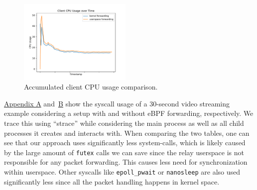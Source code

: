 \begin{figure}[H]
\begin{minipage}{0.48\textwidth}
    \end{minipage}\hfill
    \begin{minipage}{\textwidth}
        \centering
        \includegraphics[width=0.48\textwidth]{figures/04_testing_and_results/cpu_usage_client_ns.pdf}
        \caption[Client CPU usage comparison]{Accumulated client CPU usage comparison.}\label{fig:cpu-utilization-client}
    \end{minipage}
\end{figure}



\hyperref[chap:appendix-fast-relay]{Appendix A} and~\hyperref[chap:appendix-plain-relay]{B} show 
the syscall usage of a 30-second video streaming example considering a setup with and without eBPF 
forwarding, respectively.
We trace this using ``strace'' while considering the main process as well as all child processes
it creates and interacts with.
When comparing the two tables, one can see that our approach uses significantly less system-calls, 
which is likely caused by the large amount of \verb|futex| calls we can save since the relay userspace is not 
responsible for any packet forwarding.
This causes less need for synchronization within userspace.
Other syscalls like \verb|epoll_pwait| or \verb|nanosleep| are also used significantly less since all the 
packet handling happens in kernel space.

